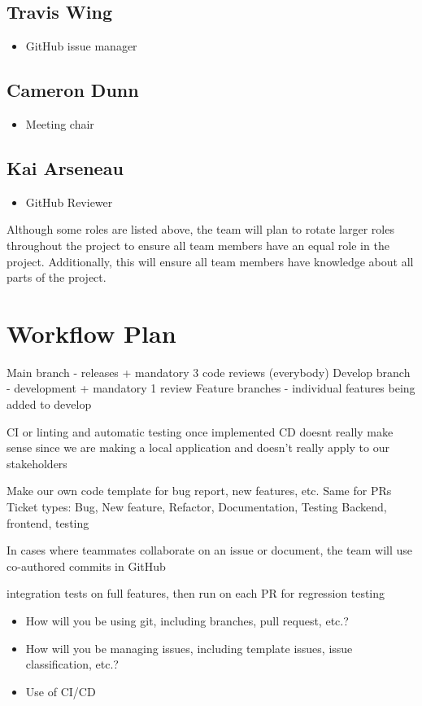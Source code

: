 \documentclass{article}
\begin{document}
\subsection*{Travis Wing}
\begin{itemize}
	\item GitHub issue manager
\end{itemize}

\subsection*{Cameron Dunn}
\begin{itemize}
	\item Meeting chair
\end{itemize}

\subsection*{Kai Arseneau}
\begin{itemize}
	\item GitHub Reviewer
\end{itemize}

Although some roles are listed above, the team will plan to rotate larger roles throughout the project to ensure all team members have an equal role in the project.
Additionally, this will ensure all team members have knowledge about all parts of the project. 


\section{Workflow Plan}
Main branch - releases + mandatory 3 code reviews (everybody)
Develop branch - development + mandatory 1 review
Feature branches - individual features being added to develop

CI or linting and automatic testing once implemented
CD doesnt really make sense since we are making a local application and doesn't really apply to our stakeholders

Make our own code template for bug report, new features, etc. Same for PRs 
Ticket types: Bug, New feature, Refactor, Documentation, Testing
Backend, frontend, testing

In cases where teammates collaborate on an issue or document, the team will use co-authored commits in GitHub

integration tests on full features, then run on each PR for regression testing

\begin{itemize}
	\item How will you be using git, including branches, pull request, etc.?
	\item How will you be managing issues, including template issues, issue
	classification, etc.?
  \item Use of CI/CD
\end{itemize}
\end{document}
